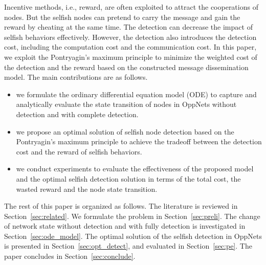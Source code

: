 Incentive methods, i.e., reward,
are often exploited to attract the cooperations of nodes.
But the selfish nodes can pretend to carry the message
and gain the reward by cheating at the same time.
The detection can decrease the impact of selfish behaviors effectively.
However, the detection also introduces the detection cost,
including the computation cost and the communication cost.
In this paper, we exploit the Pontryagin's maximum principle to
minimize the weighted cost of the detection and the reward
based on the constructed message dissemination model.
The main contributions are as follows.

\begin{itemize}
\item {we formulate the ordinary differential equation model (ODE)
to capture and analytically evaluate the state transition of nodes
in OppNets without detection and with complete detection.}
\item {we propose an optimal solution of selfish node detection
based on the Pontryagin's maximum principle
to achieve the tradeoff between the detection cost
and the reward of selfish behaviors.}
\item {we conduct experiments to evaluate
the effectiveness of the proposed model
and the optimal selfish detection solution
in terms of the total cost, the wasted reward and the node state transition.}
\end{itemize}

The rest of this paper is organized as follows.
The literature is reviewed in Section~\ref{sec:related}.
We formulate the problem in Section~\ref{sec:preli}.
The change of network state without detection and with fully detection
is investigated in Section~\ref{sec:ode_model}.
The optimal solution of the selfish detection in OppNets
is presented in Section~\ref{sec:opt_detect},
and evaluated in Section~\ref{sec:pe}.
The paper concludes in Section~\ref{sec:conclude}.
